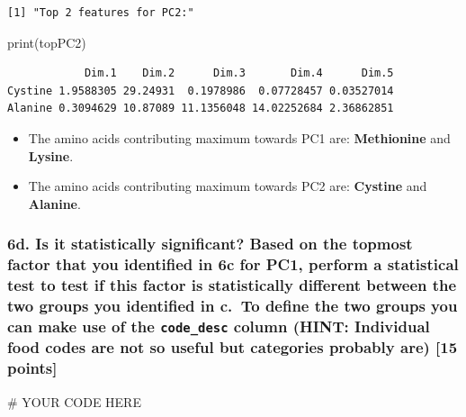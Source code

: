 \documentclass[
  letterpaper,
  DIV=11,
  numbers=noendperiod]{scrartcl}
\newenvironment{Shaded}{\begin{snugshade}}{\end{snugshade}}
\newcommand{\CommentTok}[1]{\textcolor[rgb]{0.37,0.37,0.37}{#1}}
\newcommand{\FunctionTok}[1]{\textcolor[rgb]{0.28,0.35,0.67}{#1}}
\newcommand{\NormalTok}[1]{\textcolor[rgb]{0.00,0.23,0.31}{#1}}
\begin{document}
\begin{verbatim}
[1] "Top 2 features for PC2:"
\end{verbatim}

\begin{Shaded}
\begin{Highlighting}[]
\FunctionTok{print}\NormalTok{(topPC2)}
\end{Highlighting}
\end{Shaded}

\begin{verbatim}
            Dim.1    Dim.2      Dim.3       Dim.4      Dim.5
Cystine 1.9588305 29.24931  0.1978986  0.07728457 0.03527014
Alanine 0.3094629 10.87089 11.1356048 14.02252684 2.36862851
\end{verbatim}

\begin{itemize}
\item
  The amino acids contributing maximum towards PC1 are:
  \textbf{Methionine} and \textbf{Lysine}.
\item
  The amino acids contributing maximum towards PC2 are: \textbf{Cystine}
  and \textbf{Alanine}.
\end{itemize}

\subsubsection{\texorpdfstring{6d. \textbf{Is it statistically
significant?} Based on the topmost factor that you identified in 6c for
PC1, perform a statistical test to test if this factor is statistically
different between the two groups you identified in c.~To define the two
groups you can make use of the \texttt{code\_desc} column (HINT:
Individual food codes are not so useful but categories probably are)
{[}15
points{]}}{6d. Is it statistically significant? Based on the topmost factor that you identified in 6c for PC1, perform a statistical test to test if this factor is statistically different between the two groups you identified in c.~To define the two groups you can make use of the code\_desc column (HINT: Individual food codes are not so useful but categories probably are) {[}15 points{]}}}\label{d.-is-it-statistically-significant-based-on-the-topmost-factor-that-you-identified-in-6c-for-pc1-perform-a-statistical-test-to-test-if-this-factor-is-statistically-different-between-the-two-groups-you-identified-in-c.-to-define-the-two-groups-you-can-make-use-of-the-code_desc-column-hint-individual-food-codes-are-not-so-useful-but-categories-probably-are-15-points}

\begin{Shaded}
\begin{Highlighting}[]
\CommentTok{\# YOUR CODE HERE}
\end{Highlighting}
\end{Shaded}
\end{document}

